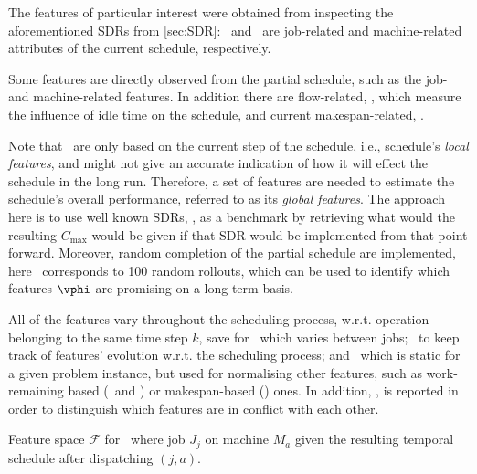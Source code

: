 The features of particular interest were obtained from inspecting the aforementioned SDRs from \cref{sec:SDR}:  
\phiJobRelated\ and \phiMacRelated\ are job-related and machine-related attributes of the current schedule, respectively. 

Some features are directly observed from the partial schedule, such as the job- and machine-related features. 
In addition there are flow-related, \phiFlowRelated, which measure the influence of idle time on the schedule, 
and current makespan-related, \phiScheduleRelated.

Note that \phiLocalRelated\ are only based on the current step of the schedule, i.e., schedule's \emph{local features}, and might not give an accurate indication of how it will effect the schedule in the long run. Therefore, a set of features are needed to estimate the schedule's overall performance, referred to as its \emph{global features}. The approach here is to use well known SDRs, \phiSDRRelated, as a benchmark by retrieving what would the resulting $C_{\max}$ would be given if that SDR would be implemented from that point forward. Moreover, random completion of the partial schedule are implemented, here \phiRND\ corresponds to 100 random rollouts, which can be used to identify which features $\vphi$ are promising on a long-term basis.  

All of the features vary throughout the scheduling process, w.r.t. operation belonging to the same time step $k$, save for \phitotalProc\ which varies between jobs; \phistep\ to keep track of features' evolution w.r.t. the scheduling process; and \phiwrmTotal\ which is static for a given problem instance, but used for normalising other features, such as work-remaining based (\phiwrmJob\ and \phiwrmMac) or makespan-based (\phiGlobalRelated) ones.
In addition, \phimac, is reported in order to distinguish which features are in conflict with each other.

\begin{table} \centering 
  \caption[Feature space $\mathcal{F}$ for \JSP]{Feature space $\mathcal{F}$ for \JSP\ where job $J_j$ on machine $M_a$ given the resulting temporal schedule after dispatching $(j,a)$.}
  \label{tbl:features}
  
\end{table}



